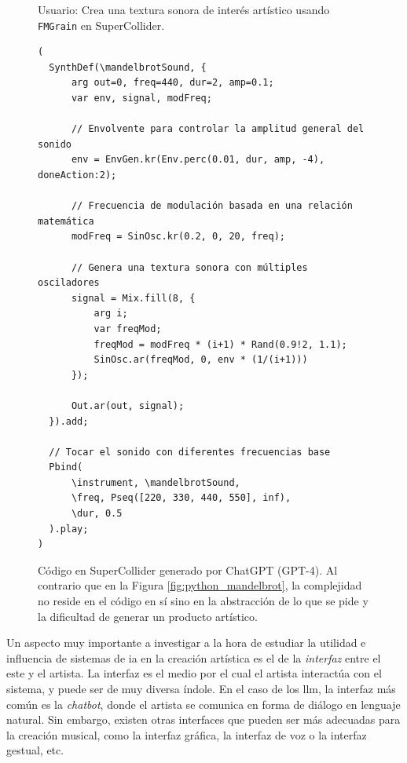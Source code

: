 \begin{figure}%
  \caption[Código en SuperCollider generado por ChatGPT (GPT-4)]{Código en SuperCollider generado por ChatGPT (GPT-4). Al contrario que en la Figura \ref{fig:python_mandelbrot}, la complejidad no reside en el código en sí sino en la abstracción de lo que se pide y la dificultad de generar un producto artístico.}
  \vspace{-.5cm}
  \vspace{.2cm}
  \centering
    \begin{mdframed}
      \fontsize{9.5pt}{11pt}\selectfont
      Usuario: Crea una textura sonora de interés artístico usando \texttt{FMGrain} en SuperCollider.
    \end{mdframed}
    \centering
      \begin{lstlisting}[style=SuperCollider-IDE, basicstyle=\footnotesize\ttfamily, numbers=none]
(
  SynthDef(\mandelbrotSound, {
      arg out=0, freq=440, dur=2, amp=0.1;
      var env, signal, modFreq;
  
      // Envolvente para controlar la amplitud general del sonido
      env = EnvGen.kr(Env.perc(0.01, dur, amp, -4), doneAction:2);
  
      // Frecuencia de modulación basada en una relación matemática
      modFreq = SinOsc.kr(0.2, 0, 20, freq);
  
      // Genera una textura sonora con múltiples osciladores
      signal = Mix.fill(8, {
          arg i;
          var freqMod;
          freqMod = modFreq * (i+1) * Rand(0.9!2, 1.1);
          SinOsc.ar(freqMod, 0, env * (1/(i+1)))
      });
  
      Out.ar(out, signal);
  }).add;
  
  // Tocar el sonido con diferentes frecuencias base
  Pbind(
      \instrument, \mandelbrotSound,
      \freq, Pseq([220, 330, 440, 550], inf),
      \dur, 0.5
  ).play;
)       
      \end{lstlisting}
  
  \source{\propio}
  \label{fig:supercollider_mandelbrot}
\end{figure}


Un aspecto muy importante a investigar a la hora de estudiar la utilidad e influencia de sistemas de \gls{ia} en la creación artística es el de la \emph{interfaz} entre el este y el artista. La interfaz es el medio por el cual el artista interactúa con el sistema, y puede ser de muy diversa índole. En el caso de los \gls{llm}, la interfaz más común es la \emph{chatbot}, donde el artista se comunica en forma de diálogo en lenguaje natural. Sin embargo, existen otras interfaces que pueden ser más adecuadas para la creación musical, como la interfaz gráfica, la interfaz de voz o la interfaz gestual, etc.

